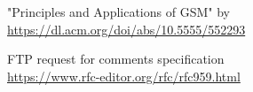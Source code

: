 \begin{thebibliography}{99}

 "Principles and Applications of GSM" by \\ \url{https://dl.acm.org/doi/abs/10.5555/552293}

 FTP request for comments specification\\ \url{https://www.rfc-editor.org/rfc/rfc959.html}



\end{thebibliography}


